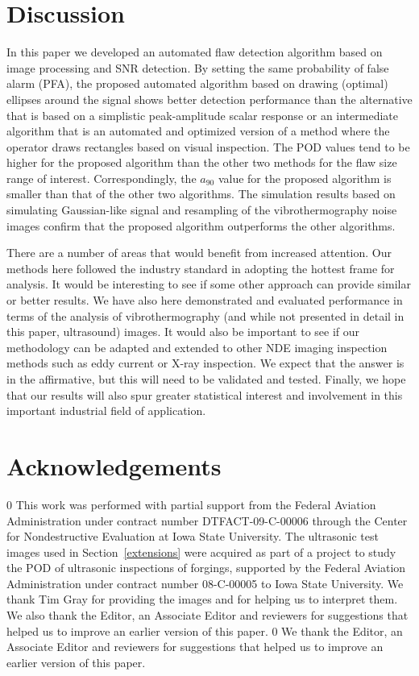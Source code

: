 \documentclass[12pt]{article}
\newcommand{\blinded}{0}
\begin{document}
 
\section{Discussion}
\label{discussion}
In this paper we developed an automated flaw detection algorithm based
on image processing and SNR detection. By setting the same probability
of false alarm  (PFA), the proposed automated algorithm based on
drawing (optimal) ellipses around the signal shows better  detection
performance than the alternative that is based on a simplistic
peak-amplitude scalar response or an intermediate algorithm that is an
automated and optimized version of a method where the operator draws
rectangles based on visual inspection. The POD  values tend to be
higher  for the proposed algorithm than the other two methods for the
flaw size range of  interest. Correspondingly, the $a_{90}$ value for
the proposed algorithm is smaller than that of the other two
algorithms. The simulation results based on simulating Gaussian-like
signal and resampling of the vibrothermography noise images confirm  
that the proposed algorithm outperforms the other algorithms. 

There are a number of areas that would benefit from increased
attention. Our methods here  followed the industry standard in
adopting the hottest frame for analysis. It would be interesting to
see if some other approach can provide similar or better results. We have
also here demonstrated and evaluated performance in terms of the
analysis of vibrothermography (and while not presented in detail in
this paper, ultrasound) images. It would also be important  to
see if our methodology can be adapted and extended to other NDE
imaging inspection methods such as eddy current or X-ray
inspection. We expect that the answer is in the affirmative, but this
will need to be validated and tested. Finally, we hope that our
results will also spur greater statistical interest and involvement in
this important  industrial field of application.
\section*{Acknowledgements}
\blinded {
This work was performed with partial support from the Federal
Aviation Administration under contract number  DTFACT-09-C-00006 through the
Center for Nondestructive Evaluation at Iowa State University. 
The ultrasonic test images used in Section~\ref{extensions} were
acquired as part of a project to study the POD of ultrasonic
inspections of forgings, supported  by  the Federal Aviation
Administration under contract number 08-C-00005 to Iowa State
University. We thank Tim Gray for providing the images
and for helping us to interpret them.
We also thank the Editor, an
Associate Editor and reviewers for suggestions that helped us to
improve an earlier version of this paper. 
}
\fi
{}\blinded {
We thank the Editor, an
Associate Editor and reviewers for suggestions that helped us to
improve an earlier version of this paper. 
}
\fi
\end{document}
